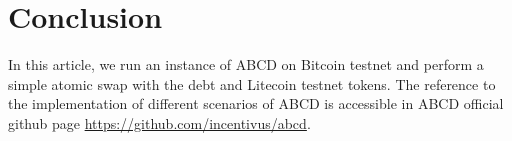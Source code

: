 \documentclass{article}
\begin{document}
%





\section{Conclusion}

In this article, we run an instance of ABCD on Bitcoin testnet and perform a simple atomic swap with the debt and Litecoin testnet tokens. The reference to the implementation of different scenarios of ABCD is accessible in ABCD official github page \href{https://github.com/incentivus/abcd}{https://github.com/incentivus/abcd}.



\end{document}
